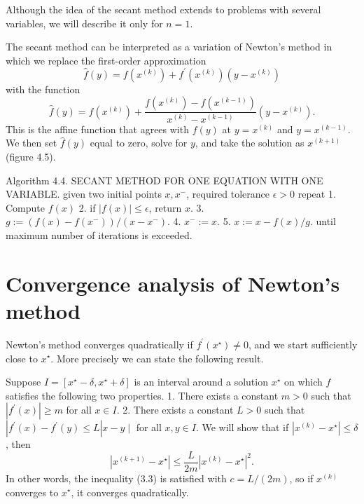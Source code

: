 Although the idea of the secant method extends to problems with several variables,
we will describe it only for $n = 1$.

The secant method can be interpreted as a variation of Newton's method in which we replace the first-order approximation
\begin{equation}
\hat{f}(y)=f\left(x^{(k)}\right)+f^{\prime}\left(x^{(k)}\right)\left(y-x^{(k)}\right)
\end{equation}
with the function
\begin{equation}
\hat{f}(y)=f\left(x^{(k)}\right)+\frac{f\left(x^{(k)}\right)-f\left(x^{(k-1)}\right)}{x^{(k)}-x^{(k-1)}}\left(y-x^{(k)}\right) .
\end{equation}
This is the affine function that agrees with $ f(y) $ at $ y=x^{(k)} $ and $ y=x^{(k-1)} $. We then set $ \hat{f}(y) $ equal to zero, solve for $ y $, and take the solution as $ x^{(k+1)} $ (figure 4.5).

\begin{algorithm}
    Algorithm 4.4. SECANT METHOD FOR ONE EQUATION WITH ONE VARIABLE.
given two initial points $ x, x^{-} $, required tolerance $ \epsilon>0 $
repeat
1. Compute $ f(x) $
2. if $ |f(x)| \leq \epsilon $, return $ x $.
3. $ g:=\left(f(x)-f\left(x^{-}\right)\right) /\left(x-x^{-}\right) $.
4. $ x^{-}:=x $.
5. $ x:=x-f(x) / g $.
until maximum number of iterations is exceeded.
\end{algorithm}

\section{ Convergence analysis of Newton's method}

Newton's method converges quadratically if $ f^{\prime}\left(x^{\star}\right) \neq 0 $, and we start sufficiently close to $ x^{\star} $. More precisely we can state the following result.

Suppose $ I=\left[x^{\star}-\delta, x^{\star}+\delta\right] $ is an interval around a solution $ x^{\star} $ on which $ f $ satisfies the following two properties.
1. There exists a constant $ m>0 $ such that $ \left|f^{\prime}(x)\right| \geq m $ for all $ x \in I $.
2. There exists a constant $ L>0 $ such that $ \left|f^{\prime}(x)-f^{\prime}(y) \leq L\right| x-y \mid $ for all $ x, y \in I $.
We will show that if $ \left|x^{(k)}-x^{\star}\right| \leq \delta $, then
\begin{equation}
\left|x^{(k+1)}-x^{\star}\right| \leq \frac{L}{2 m}\left|x^{(k)}-x^{\star}\right|^{2} .
\end{equation}
In other words, the inequality (3.3) is satisfied with $ c=L /(2 m) $, so if $ x^{(k)} $ converges to $ x^{\star} $, it converges quadratically.


